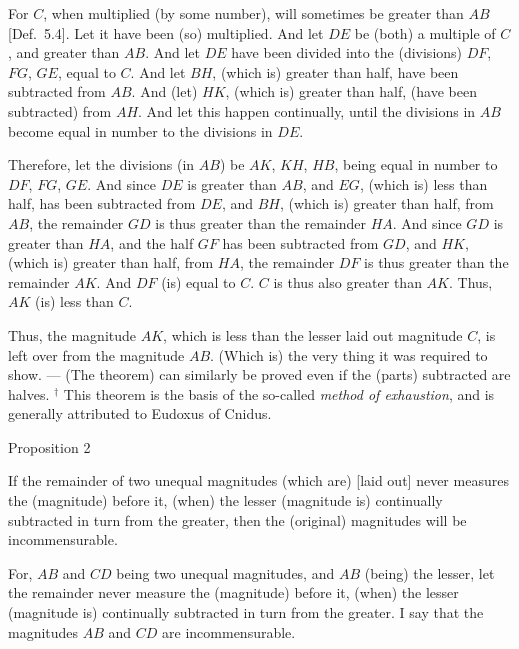 \epsfysize=1.1in
\centerline{}

For $C$, when multiplied (by some number), will sometimes be greater than $AB$ [Def.~5.4]. Let it have
been (so) multiplied. And let $DE$ be (both) a multiple of $C$, and greater
than $AB$. And let $DE$ have been divided into the (divisions) $DF$, $FG$,
$GE$, equal to $C$. And   let $BH$, (which is) greater than half, have been subtracted from $AB$. And  (let) $HK$, (which is) greater than half, (have been subtracted) from $AH$. And let this happen continually, until the divisions in
$AB$ become equal in number to the divisions in $DE$.

Therefore, let the divisions (in $AB$) be $AK$, $KH$, $HB$, being equal in number to $DF$, $FG$, $GE$.  And since $DE$ is greater than $AB$, and $EG$, (which is) less than half, has been subtracted from $DE$, and $BH$, (which is) greater
than half, from $AB$, the remainder $GD$ is thus greater than the remainder
$HA$. And since $GD$ is greater than $HA$, and the half $GF$ has been
subtracted from $GD$, and $HK$, (which is) greater than half, from $HA$,
the remainder $DF$ is thus greater than the remainder $AK$. And $DF$
(is) equal to $C$. $C$ is thus also greater than $AK$.
Thus, $AK$ (is) less than $C$.

Thus, the magnitude $AK$,  which is less
than the lesser laid out magnitude $C$, is left over from the magnitude $AB$. (Which is) the very thing it was required to show. --- (The theorem) can similarly be proved even if  the
(parts) subtracted are halves.
{\footnotesize\noindent $^\dag$ This theorem is the basis of the so-called {\em method of exhaustion}, and is generally attributed to Eudoxus of Cnidus.}


\begin{center}
{\large Proposition 2}
\end{center}

If the remainder of two unequal magnitudes (which are) [laid out] never measures the (magnitude) before it, (when) the lesser (magnitude is) continually subtracted in turn from the greater, then the (original) magnitudes will be incommensurable.

For, $AB$ and $CD$ being two unequal magnitudes, and $AB$ (being) the lesser, let the remainder
never measure the (magnitude) before it,
(when) the lesser (magnitude is) continually subtracted in turn from the greater. I say that
the magnitudes $AB$ and $CD$ are incommensurable.

